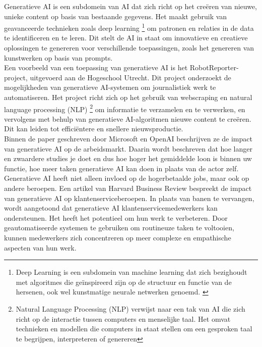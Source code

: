 Generatieve AI is een subdomein van AI dat zich richt op het creëren van nieuwe, unieke content op basis van bestaande gegevens. Het maakt gebruik van geavanceerde technieken zoals deep learning  \footnote{Deep Learning is een subdomein van machine learning dat zich bezighoudt met algoritmes die geïnspireerd zijn op de structuur en functie van de hersenen, ook wel kunstmatige neurale netwerken genoemd. \autocite{footnote_DL}} om patronen en relaties in de data te identificeren en te leren. Dit stelt de AI in staat om innovatieve en creatieve oplossingen te genereren voor verschillende toepassingen, zoals het genereren van kunstwerken op basis van prompts. \autocite{SonixAI2021}\\

Een voorbeeld van een toepassing van generatieve AI is het RobotReporter-project, uitgevoerd aan de Hogeschool Utrecht. Dit project onderzoekt de mogelijkheden van generatieve AI-systemen om journalistiek werk te automatiseren. Het project richt zich op het gebruik van webscraping en natural language processing (NLP) \footnote{Natural Language Processing (NLP) verwijst naar een tak van AI die zich richt op de interactie tussen computers en menselijke taal. Het omvat technieken en modellen die computers in staat stellen om een gesproken taal te begrijpen, interpreteren of genereren} om informatie te verzamelen en te verwerken, en vervolgens met behulp van generatieve AI-algoritmen nieuwe content te creëren. Dit kan leiden tot efficiëntere en snellere nieuwsproductie. \autocite{HU2021}\\

Binnen de paper geschreven door Microsoft en OpenAI beschrijven ze de impact van generatieve AI op de arbeidsmarkt. Daarin wordt beschreven dat hoe langer en zwaardere studies je doet en dus hoe hoger het gemiddelde loon is binnen uw functie, hoe meer taken generatieve AI kan doen in plaats van de actor zelf. \autocite{gpt_micai} \\ 

Generatieve AI heeft niet alleen invloed op de hogerbetaalde jobs, maar ook op andere beroepen. Een artikel van Harvard Business Review bespreekt de impact van generatieve AI op klantenserviceberoepen. In plaats van banen te vervangen, wordt aangetoond dat generatieve AI klantenservicemedewerkers kan ondersteunen. Het heeft het potentieel om hun werk te verbeteren. Door geautomatiseerde systemen te gebruiken om routineuze taken te voltooien, kunnen medewerkers zich concentreren op meer complexe en empathische aspecten van hun werk. \autocite{HBR2023}\\

